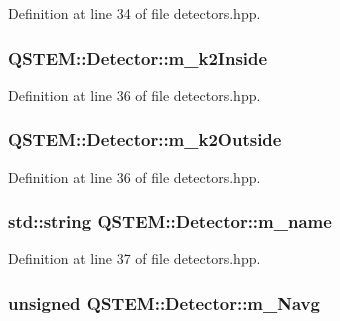 Definition at line 34 of file detectors.\-hpp.

\hypertarget{class_q_s_t_e_m_1_1_detector_a8db44ddd6d1961fb9dec10aecbc14fad}{
\subsubsection[{m\-\_\-k2\-Inside}]{ Q\-S\-T\-E\-M\-::\-Detector\-::m\-\_\-k2\-Inside}}\label{class_q_s_t_e_m_1_1_detector_a8db44ddd6d1961fb9dec10aecbc14fad}


Definition at line 36 of file detectors.\-hpp.

\hypertarget{class_q_s_t_e_m_1_1_detector_afe3fcd3513821b2966ac799701f1a915}{
\subsubsection[{m\-\_\-k2\-Outside}]{ Q\-S\-T\-E\-M\-::\-Detector\-::m\-\_\-k2\-Outside}}\label{class_q_s_t_e_m_1_1_detector_afe3fcd3513821b2966ac799701f1a915}


Definition at line 36 of file detectors.\-hpp.

\hypertarget{class_q_s_t_e_m_1_1_detector_a167f5d5404ab2b4cd542dff66b646765}{
\subsubsection[{m\-\_\-name}]{\setlength{\rightskip}{0pt plus 5cm}std\-::string Q\-S\-T\-E\-M\-::\-Detector\-::m\-\_\-name}}\label{class_q_s_t_e_m_1_1_detector_a167f5d5404ab2b4cd542dff66b646765}


Definition at line 37 of file detectors.\-hpp.

\hypertarget{class_q_s_t_e_m_1_1_detector_ab7d34d30b400e5c7b5b7850d949012d2}{
\subsubsection[{m\-\_\-\-Navg}]{\setlength{\rightskip}{0pt plus 5cm}unsigned Q\-S\-T\-E\-M\-::\-Detector\-::m\-\_\-\-Navg}}\label{class_q_s_t_e_m_1_1_detector_ab7d34d30b400e5c7b5b7850d949012d2}


